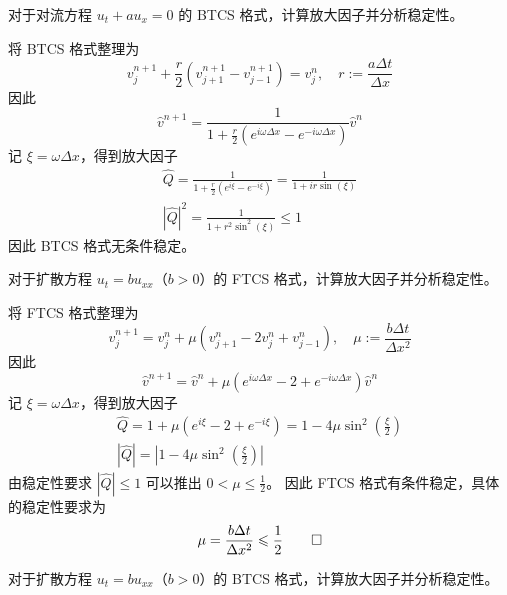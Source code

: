\begin{example}\label{eg:btcs}
    对于对流方程 $u_t + a u_x = 0$ 的 BTCS 格式，计算放大因子并分析稳定性。
\end{example}

\begin{solution*}
    将 BTCS 格式整理为
    \[
        v_j^{n+1} + \frac{r}2 \left( v_{j+1}^{n+1} - v_{j-1}^{n+1} \right) = v_j^n, \quad r := \frac{a \Delta t}{\Delta x}
    \]
    因此
    \[
        \hat{v}^{n+1} = \frac{1}{1 + \frac{r}2 (e^{i \omega \Delta x} - e^{-i \omega \Delta x})} \hat{v}^n
    \]
    记 $\xi = \omega \Delta x$，得到放大因子
    \begin{gather*}
        \widehat{Q} ={} \frac{1}{1 + \frac{r}2 (e^{i \xi} - e^{-i \xi})} = \frac{1}{1 + i r \sin(\xi)}            \\
        |\widehat{Q}|^2  ={} \frac{1}{1 + r^2 \sin^2(\xi)} \le 1
    \end{gather*}
    因此 BTCS 格式无条件稳定。
\end{solution*}

\begin{example}
    对于扩散方程 $u_t = b u_{xx}$（$b>0$）的 FTCS 格式，计算放大因子并分析稳定性。
\end{example}

\begin{solution*}
    将 FTCS 格式整理为
    \[
        v_j^{n+1} = v_j^n + \mu \left( v_{j+1}^n - 2 v_j^n + v_{j-1}^n \right), \quad \mu := \frac{b \Delta t}{\Delta x^2}
    \]
    因此
    \[
        \hat{v}^{n+1} = \hat{v}^n + \mu (e^{i \omega \Delta x} - 2 + e^{- i \omega \Delta x}) \hat{v}^n
    \]
    记 $\xi = \omega \Delta x$，得到放大因子
    \begin{gather*}
        \widehat{Q} ={} 1 + \mu (e^{i \xi} - 2 + e^{- i \xi}) =  1 - 4 \mu \sin^2(\frac{\xi}2) \\
        |\widehat{Q}| ={} \left|1 - 4 \mu \sin^2(\frac{\xi}2)\right|
    \end{gather*}
    由稳定性要求 $|\widehat{Q}| \le 1$ 可以推出 $0 < \mu \le \frac12$。
    因此 FTCS 格式有条件稳定，具体的稳定性要求为
    \[
        \mu = \frac{b \Delta t}{\Delta x^2} \le \frac12 \qedhere
    \]
\end{solution*}

\begin{example}
    对于扩散方程 $u_t = b u_{xx}$（$b>0$）的 BTCS 格式，计算放大因子并分析稳定性。
\end{example}


